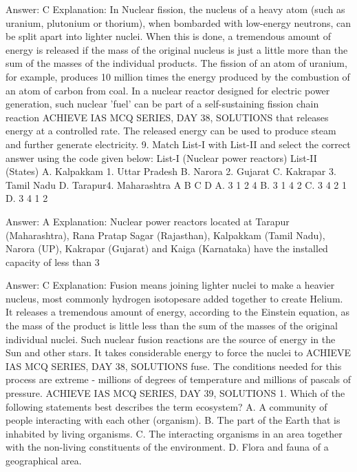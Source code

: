 Answer: C
Explanation: In Nuclear fission, the nucleus of a heavy atom (such as uranium, plutonium or thorium), when bombarded with low-energy neutrons, can be split apart into lighter nuclei. When this is done, a tremendous amount of energy is released if the mass of the original nucleus is just a little more than the sum of the masses of the individual products. The fission of an atom of uranium, for example, produces 10 million times the energy produced by the combustion of an atom of carbon from coal. In a nuclear reactor designed for electric power generation, such nuclear 'fuel' can be part of a self-sustaining fission chain reaction ACHIEVE IAS MCQ SERIES, DAY 38, SOLUTIONS that releases energy at a controlled rate. The released energy can be used to produce steam and further generate electricity. 9. Match List-I with List-II and select the correct answer using the code given below: List-I (Nuclear power reactors) List-II (States) A. Kalpakkam 1. Uttar Pradesh B. Narora 2. Gujarat C. Kakrapar 3. Tamil Nadu D. Tarapur4. Maharashtra A B C D A. 3 1 2 4 B. 3 1 4 2 C. 3 4 2 1 D. 3 4 1 2 

Answer: A
Explanation: Nuclear power reactors located at Tarapur (Maharashtra), Rana Pratap Sagar (Rajasthan), Kalpakkam (Tamil Nadu), Narora (UP), Kakrapar (Gujarat) and Kaiga (Karnataka) have the installed capacity of less than 3%

Answer: C
Explanation: Fusion means joining lighter nuclei to make a heavier nucleus, most commonly hydrogen isotopesare added together to create Helium. It releases a tremendous amount of energy, according to the Einstein equation, as the mass of the product is little less than the sum of the masses of the original individual nuclei. Such nuclear fusion reactions are the source of energy in the Sun and other stars. It takes considerable energy to force the nuclei to ACHIEVE IAS MCQ SERIES, DAY 38, SOLUTIONS fuse. The conditions needed for this process are extreme - millions of degrees of temperature and millions of pascals of pressure. ACHIEVE IAS MCQ SERIES, DAY 39, SOLUTIONS 1. Which of the following statements best describes the term ecosystem? A. A community of people interacting with each other (organism). B. The part of the Earth that is inhabited by living organisms. C. The interacting organisms in an area together with the non-living constituents of the environment. D. Flora and fauna of a geographical area. 

